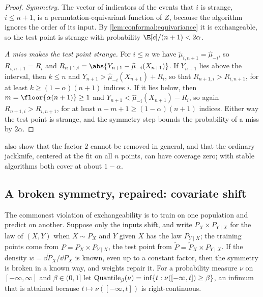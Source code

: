 \begin{refsection}
\begin{proof}
\emph{Symmetry.} The vector of indicators of the events that $i$ is strange, $i\le n+1$, is a permutation-equivariant function of $Z$, because the algorithm ignores the order of its input. By \cref{lem:conformal:equivariance} it is exchangeable, so the test point is strange with probability $\E[c]/(n+1)<2\alpha$.

\emph{A miss makes the test point strange.} For $i\le n$ we have $\widetilde\mu_{i,n+1}=\widehat\mu_{-i}$, so $R_{i,n+1}=R_i$ and $R_{n+1,i}=\abs{Y_{n+1}-\widehat\mu_{-i}(X_{n+1})}$. If $Y_{n+1}$ lies above the interval, then $k\le n$ and $Y_{n+1}>\widehat\mu_{-i}(X_{n+1})+R_i$, so that $R_{n+1,i}>R_{i,n+1}$, for at least $k\ge(1-\alpha)(n+1)$ indices $i$. If it lies below, then $m=\floor{\alpha(n+1)}\ge1$ and $Y_{n+1}<\widehat\mu_{-i}(X_{n+1})-R_i$, so again $R_{n+1,i}>R_{i,n+1}$, for at least $n-m+1\ge(1-\alpha)(n+1)$ indices. Either way the test point is strange, and the symmetry step bounds the probability of a miss by $2\alpha$.
\end{proof}

\textcite{Barber2021a} also show that the factor $2$ cannot be removed in general, and that the ordinary jackknife, centered at the fit on all $n$ points, can have coverage zero; with stable algorithms both cover at about $1-\alpha$.

\subsection{A broken symmetry, repaired: covariate shift}

The commonest violation of exchangeability is to train on one population and predict on another. Suppose only the inputs shift, and write $P_X\times P_{Y\mid X}$ for the law of $(X,Y)$ when $X\sim P_X$ and $Y$ given $X$ has the law $P_{Y\mid X}$; the training points come from $P=P_X\times P_{Y\mid X}$, the test point from $\widetilde P=\widetilde P_X\times P_{Y\mid X}$. If the density $w=\dd\widetilde P_X/\dd P_X$ is known, even up to a constant factor, then the symmetry is broken in a known way, and weights repair it. For a probability measure $\nu$ on $[-\infty,\infty]$ and $\beta\in(0,1]$ let $\operatorname{Quantile}_\beta(\nu)=\inf\{t : \nu([-\infty,t])\ge\beta\}$, an infimum that is attained because $t\mapsto\nu([-\infty,t])$ is right-continuous.


\end{refsection}
